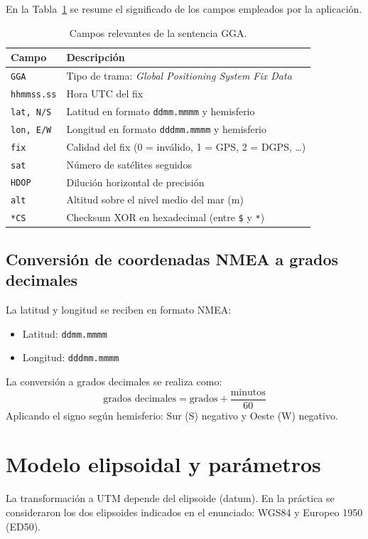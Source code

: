 \documentclass[10pt]{article}
\begin{document}
En la Tabla~\ref{tab:gga} se resume el significado de los campos empleados por la aplicación.

\begin{table}[h]
\centering
\renewcommand{\arraystretch}{1.15}
\begin{tabular}{@{}ll@{}}
\toprule
\textbf{Campo} & \textbf{Descripción} \\
\midrule
\texttt{GGA} & Tipo de trama: \textit{Global Positioning System Fix Data} \\
\texttt{hhmmss.ss} & Hora UTC del fix \\
\texttt{lat, N/S} & Latitud en formato \texttt{ddmm.mmmm} y hemisferio \\
\texttt{lon, E/W} & Longitud en formato \texttt{dddmm.mmmm} y hemisferio \\
\texttt{fix} & Calidad del fix (0 = inválido, 1 = GPS, 2 = DGPS, \dots) \\
\texttt{sat} & Número de satélites seguidos \\
\texttt{HDOP} & Dilución horizontal de precisión \\
\texttt{alt} & Altitud sobre el nivel medio del mar (m) \\
\texttt{*CS} & Checksum XOR en hexadecimal (entre \texttt{\$} y \texttt{*}) \\
\bottomrule
\end{tabular}
\caption{Campos relevantes de la sentencia GGA.}
\label{tab:gga}
\end{table}

\subsection{Conversión de coordenadas NMEA a grados decimales}
La latitud y longitud se reciben en formato NMEA:
\begin{itemize}[leftmargin=1.2em]
\item Latitud: \texttt{ddmm.mmmm}
\item Longitud: \texttt{dddmm.mmmm}
\end{itemize}

La conversión a grados decimales se realiza como:
\[
\text{grados decimales} = \text{grados} + \frac{\text{minutos}}{60}
\]
Aplicando el signo según hemisferio: Sur (S) negativo y Oeste (W) negativo.

\section{Modelo elipsoidal y parámetros}
La transformación a UTM depende del elipsoide (datum). En la práctica se consideraron los dos elipsoides indicados en el enunciado: WGS84 y Europeo 1950 (ED50).
\end{document}
